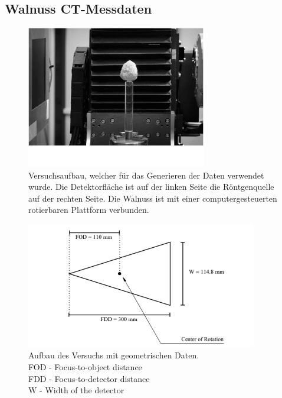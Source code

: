\subsection{Walnuss CT-Messdaten}\label{k4.2.ct.walnuss}

\begin{figure}
    \centering
    \includegraphics[width=0.7\textwidth]{k4.2/ctabbild.png}
    \caption{Versuchsaufbau, welcher für das Generieren der Daten verwendet wurde. Die Detektorfläche ist auf der linken Seite die Röntgenquelle auf der rechten Seite. Die Walnuss ist mit einer computergesteuerten rotierbaren Plattform verbunden.}
    \label{k4.2.fig.ctAbbild}
\end{figure}
\begin{figure}
    \centering
    \includegraphics[width=0.9\textwidth]{k4.2/geometry.png}
    \caption{Aufbau des Versuchs mit geometrischen Daten.\\
    FOD - Focus-to-object distance\\
    FDD - Focus-to-detector distance\\
    W - Width of the detector
    }
    \label{k4.2.fig.Geo}
\end{figure}

